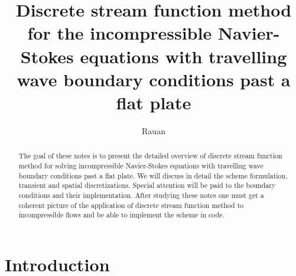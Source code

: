 \documentclass{article}
\title{Discrete stream function method \\ for the incompressible Navier-Stokes equations with travelling wave boundary conditions past a flat plate}
\author{Rauan}
\numberwithin{equation}{section}
\begin{document}
\maketitle

\begin{abstract}
The goal of these notes is to present the detailed overview of discrete stream function method for solving incompressible Navier-Stokes equations with travelling wave boundary conditions past a flat plate. We will discuss in detail the scheme formulation, transient and spatial discretizations. Special attention will be paid to the boundary conditions and their implementation. After studying these notes one must get a coherent picture of the application of discrete stream function method to incompressible flows and be able to implement the scheme in code.
\end{abstract}

\tableofcontents

\section{Introduction}\label{sec:introduction}
\end{document}
